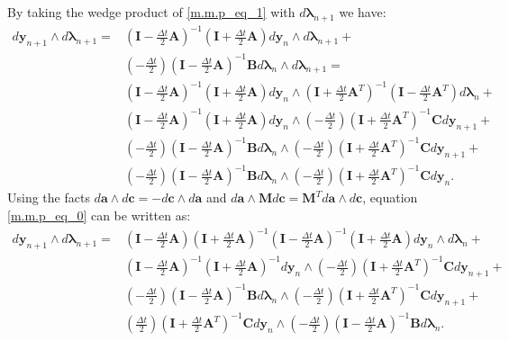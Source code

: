 \documentclass[a4paper, 10pt]{article}
\begin{document}
By taking the wedge product of \eqref{m.m.p_eq_1} with $d\bm{\lambda}_{n+1}$ we have:
\begin{align}
    d\bm{y}_{n+1} \wedge d\bm{\lambda}_{n+1} =  & (\bm{I}-\tfrac{\Delta{t}}{2}\bm{A})^{-1}(\bm{I}+\tfrac{\Delta{t}}{2}\bm{A})d\bm{y}_{n} \wedge  d\bm{\lambda}_{n+1} + \nonumber \\
    & (-\tfrac{\Delta{t}}{2}) (\bm{I}-\tfrac{\Delta{t}}{2}\bm{A})^{-1}\bm{B}d\bm{\lambda}_{n} \wedge d\bm{\lambda}_{n+1}  = \nonumber \\
    & (\bm{I}-\tfrac{\Delta{t}}{2}\bm{A})^{-1}(\bm{I}+\tfrac{\Delta{t}}{2}\bm{A})d\bm{y}_{n} \wedge (\bm{I}+\tfrac{\Delta{t}}{2}\bm{A}^{T})^{-1}(\bm{I}-\tfrac{\Delta{t}}{2}\bm{A}^{T})d\bm{\lambda}_{n} + \nonumber \\
    & (\bm{I}-\tfrac{\Delta{t}}{2}\bm{A})^{-1}(\bm{I}+\tfrac{\Delta{t}}{2}\bm{A})d\bm{y}_{n} \wedge   (-\tfrac{\Delta{t}}{2}) (\bm{I}+\tfrac{\Delta{t}}{2}\bm{A}^{T})^{-1}\bm{C}d\bm{y}_{n+1} + \nonumber \\
    & (-\tfrac{\Delta{t}}{2}) (\bm{I}-\tfrac{\Delta{t}}{2}\bm{A})^{-1}\bm{B}d\bm{\lambda}_{n} \wedge (-\tfrac{\Delta{t}}{2}) (\bm{I}+\tfrac{\Delta{t}}{2}\bm{A}^{T})^{-1}\bm{C}d\bm{y}_{n+1} + \nonumber \\
    & (-\tfrac{\Delta{t}}{2}) (\bm{I}-\tfrac{\Delta{t}}{2}\bm{A})^{-1}\bm{B}d\bm{\lambda}_{n} \wedge (-\tfrac{\Delta{t}}{2}) (\bm{I}+\tfrac{\Delta{t}}{2}\bm{A}^{T})^{-1}\bm{C}d\bm{y}_{n}. \label{m.m.p_eq_0}
\end{align}
Using the facts $d\bm{a} \wedge d\bm{c} = -d\bm{c} \wedge d\bm{a}$ and $d\bm{a} \wedge \bm{M}d\bm{c} = \bm{M}^{T}d\bm{a} \wedge d\bm{c}$, equation \eqref{m.m.p_eq_0} can be written as:
\begin{align}
    d\bm{y}_{n+1} \wedge d\bm{\lambda}_{n+1} = &  (\bm{I}-\tfrac{\Delta{t}}{2}\bm{A})(\bm{I}+\tfrac{\Delta{t}}{2}\bm{A})^{-1}(\bm{I}-\tfrac{\Delta{t}}{2}\bm{A})^{-1}(\bm{I}+\tfrac{\Delta{t}}{2}\bm{A})  d\bm{y}_{n} \wedge d\bm{\lambda}_{n} + \nonumber \\
    & (\bm{I}-\tfrac{\Delta{t}}{2}\bm{A})^{-1} (\bm{I}+\tfrac{\Delta{t}}{2}\bm{A})^{-1} d\bm{y}_{n} \wedge (-\tfrac{\Delta{t}}{2})(\bm{I}+\tfrac{\Delta{t}}{2}\bm{A}^{T})^{-1}\bm{C} d\bm{y}_{n+1} + \nonumber \\
    & (-\tfrac{\Delta{t}}{2})(\bm{I}-\tfrac{\Delta{t}}{2}\bm{A})^{-1}\bm{B} d\bm{\lambda}_{n} \wedge (-\tfrac{\Delta{t}}{2})(\bm{I}+\tfrac{\Delta{t}}{2}\bm{A}^{T})^{-1}\bm{C} d\bm{y}_{n+1} + \nonumber \\
    & (\tfrac{\Delta{t}}{2})(\bm{I}+\tfrac{\Delta{t}}{2}\bm{A}^{T})^{-1}\bm{C} d\bm{y}_{n} \wedge (-\tfrac{\Delta{t}}{2})(\bm{I}-\tfrac{\Delta{t}}{2}\bm{A})^{-1}\bm{B} d\bm{\lambda}_{n}. \label{m.m.p_eq_3}
\end{align}
\end{document}
